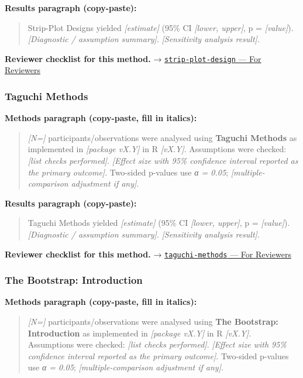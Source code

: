 \documentclass[
]{article}
\begin{document}
\textbf{Results paragraph (copy-paste):}

\begin{quote}
Strip-Plot Designs yielded \emph{{[}estimate{]}} (95\% CI
\emph{{[}lower, upper{]}}, p = \emph{{[}value{]}}). \emph{{[}Diagnostic
/ assumption summary{]}}. \emph{{[}Sensitivity analysis result{]}}.
\end{quote}

\textbf{Reviewer checklist for this method.} →
\href{../chapters/16-design/strip-plot-design.Rmd\#for-reviewers}{\texttt{strip-plot-design}
--- For Reviewers}

\subsubsection{Taguchi Methods}\label{taguchi-methods}

\textbf{Methods paragraph (copy-paste, fill in italics):}

\begin{quote}
\emph{{[}N={]}} participants/observations were analysed using
\textbf{Taguchi Methods} as implemented in \emph{{[}package vX.Y{]}} in
R \emph{{[}vX.Y{]}}. Assumptions were checked: \emph{{[}list checks
performed{]}}. \emph{{[}Effect size with 95\% confidence interval
reported as the primary outcome{]}}. Two-sided p-values use \emph{α =
0.05}; \emph{{[}multiple-comparison adjustment if any{]}}.
\end{quote}

\textbf{Results paragraph (copy-paste):}

\begin{quote}
Taguchi Methods yielded \emph{{[}estimate{]}} (95\% CI \emph{{[}lower,
upper{]}}, p = \emph{{[}value{]}}). \emph{{[}Diagnostic / assumption
summary{]}}. \emph{{[}Sensitivity analysis result{]}}.
\end{quote}

\textbf{Reviewer checklist for this method.} →
\href{../chapters/16-design/taguchi-methods.Rmd\#for-reviewers}{\texttt{taguchi-methods}
--- For Reviewers}

\subsubsection{The Bootstrap:
Introduction}\label{the-bootstrap-introduction}

\textbf{Methods paragraph (copy-paste, fill in italics):}

\begin{quote}
\emph{{[}N={]}} participants/observations were analysed using
\textbf{The Bootstrap: Introduction} as implemented in \emph{{[}package
vX.Y{]}} in R \emph{{[}vX.Y{]}}. Assumptions were checked: \emph{{[}list
checks performed{]}}. \emph{{[}Effect size with 95\% confidence interval
reported as the primary outcome{]}}. Two-sided p-values use \emph{α =
0.05}; \emph{{[}multiple-comparison adjustment if any{]}}.
\end{quote}
\end{document}
